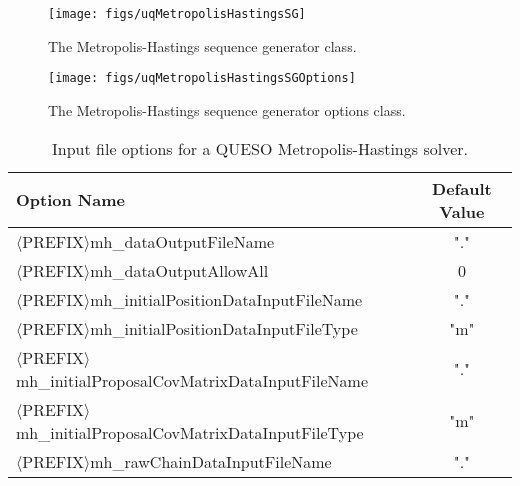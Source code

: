 \begin{figure}[htpb]
\centering
\texttt{[image: figs/uqMetropolisHastingsSG]}
\vspace*{-8pt}
\caption{The Metropolis-Hastings sequence generator class.}
\label{fig-metropolis-hastings-solver-class}
\end{figure}

\begin{figure}[htpb]
\centering
\texttt{[image: figs/uqMetropolisHastingsSGOptions]}
\vspace*{-8pt}
\caption{The Metropolis-Hastings sequence generator options class.}
\label{fig-metropolis-hastings-options-class}
\end{figure}



\begin{table}[htpb]
\begin{center}
\caption{Input file options for a QUESO Metropolis-Hastings solver.}\label{tab-metropolis-hastings-options}
\ttfamily
\begin{tabular}{l c} %
\toprule
\rmfamily Option Name                                    & \rmfamily Default Value \\%
\midrule\midrule
 $\langle$PREFIX$\rangle$mh\_dataOutputFileName                       & "."   \\ %
 $\langle$PREFIX$\rangle$mh\_dataOutputAllowAll                       & 0     \\ %
 $\langle$PREFIX$\rangle$mh\_initialPositionDataInputFileName         & "."   \\ %
 $\langle$PREFIX$\rangle$mh\_initialPositionDataInputFileType         & "m"   \\ %
 $\langle$PREFIX$\rangle$mh\_initialProposalCovMatrixDataInputFileName& "."   \\ %
 $\langle$PREFIX$\rangle$mh\_initialProposalCovMatrixDataInputFileType& "m"   \\ %
 $\langle$PREFIX$\rangle$mh\_rawChainDataInputFileName                & "."   \\ %

\end{tabular}
\end{center}
\end{table}
